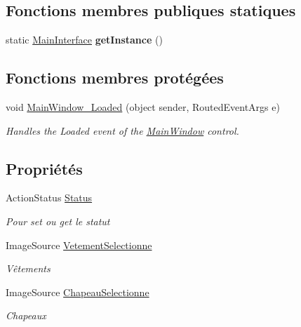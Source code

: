 \subsection*{Fonctions membres publiques statiques}
\begin{DoxyCompactItemize}
\item 
\hypertarget{class_w_p_f_page_switch_1_1_main_interface_adead34222f6078f1efa84f1a75c7ec5d}{static \hyperlink{class_w_p_f_page_switch_1_1_main_interface}{Main\+Interface} {\bfseries get\+Instance} ()}\label{class_w_p_f_page_switch_1_1_main_interface_adead34222f6078f1efa84f1a75c7ec5d}

\end{DoxyCompactItemize}
\subsection*{Fonctions membres protégées}
\begin{DoxyCompactItemize}
\item 
void \hyperlink{class_w_p_f_page_switch_1_1_main_interface_af550c908d0894dd05836253a5621a9ed}{Main\+Window\+\_\+\+Loaded} (object sender, Routed\+Event\+Args e)
\begin{DoxyCompactList}\small\item\em Handles the Loaded event of the \hyperlink{class_w_p_f_page_switch_1_1_main_window}{Main\+Window} control. \end{DoxyCompactList}\end{DoxyCompactItemize}
\subsection*{Propriétés}
\begin{DoxyCompactItemize}
\item 
Action\+Status \hyperlink{class_w_p_f_page_switch_1_1_main_interface_ad6597e38bbdd6ccd1fd9fdbc203aa4be}{Status}
\begin{DoxyCompactList}\small\item\em Pour set ou get le statut \end{DoxyCompactList}\item 
Image\+Source \hyperlink{class_w_p_f_page_switch_1_1_main_interface_a4d6e65debb17ae57a1b9e95a5e2a28ac}{Vetement\+Selectionne}
\begin{DoxyCompactList}\small\item\em Vêtements \end{DoxyCompactList}\item 
Image\+Source \hyperlink{class_w_p_f_page_switch_1_1_main_interface_a321e73a09bf8e4c41fbff9419d865970}{Chapeau\+Selectionne}
\begin{DoxyCompactList}\small\item\em Chapeaux \end{DoxyCompactList}\end{DoxyCompactItemize}


